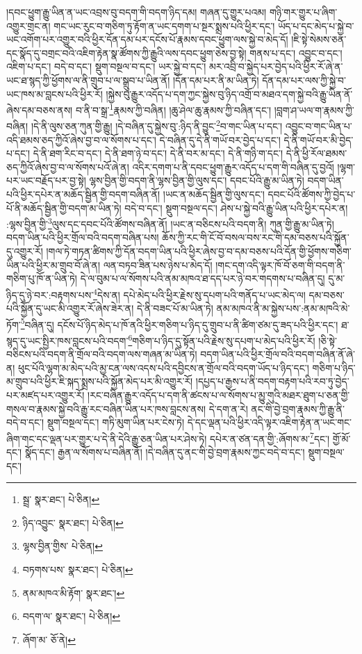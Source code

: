 །དབང་ཕྱུག་རྒྱུ་ཡིན་ན་ཡང་འབྲས་བུ་བདག་གི་བདག་ཉིད་དམ། གཞན་དུ་གྱུར་པའམ། གཉི་གར་གྱུར་པ་ཞིག་འགྱུར་གྲང་ན། གང་ཡང་རུང་བ་གཅིག་ཏུ་རྟོག་ན་ཡང་དགག་པ་སྔར་སྨྲས་པའི་ཕྱིར་དང་། ཡོད་པ་དང་མེད་པ་སྐྱེ་བ་ཡང་འགོག་པར་འགྱུར་བའི་ཕྱིར་དོན་དམ་པར་དངོས་པོ་རྣམས་དབང་ཕྱུག་ལས་སྐྱེ་བ་མེད་དོ། །ཇི་སྟེ་སེམས་ཅན་དང་སྣོད་དུ་བགྲང་བའི་འཇིག་རྟེན་སྣ་ཚོགས་ཀྱི་རྒྱུའི་ལས་དབང་ཕྱུག་ཅེས་བྱ་སྟེ། གནས་པ་དང་། འབྱུང་བ་དང་། འཇིག་པ་དང་། བདེ་བ་དང་། སྡུག་བསྔལ་བ་དང་། ཡར་སྐྱེ་བ་དང་། མར་འབྲི་བ་སྐྱེད་པར་བྱེད་པའི་ཕྱིར་རོ་ཞེ་ན་ཡང་ཐ་སྙད་ཀྱི་ཕྱོགས་ལ་ནི་གྲུབ་པ་ལ་སྒྲུབ་པ་ཡིན་ནོ། །དོན་དམ་པར་ནི་མ་ཡིན་ཏེ། དོན་དམ་པར་ལས་ཀྱི་སྐྱེ་བ་ཡང་ཁས་མ་བླངས་པའི་ཕྱིར་རོ། །སྐྱེས་བུ་རྒྱུར་འདོད་པ་དག་ཀྱང་སྐྱེས་བུ་ཉིད་འགྲོ་བ་མཐའ་དག་སྐྱེ་བའི་རྒྱུ་ཡིན་ནོ་ཞེས་དམ་བཅས་ནས། བ་ནི་བ་སྒྲ་\footnote{སྦྲ་  སྣར་ཐང་།  པེ་ཅིན། }རྣམས་ཀྱི་བཞིན། །ཆུ་ཤེལ་ཆུ་རྣམས་ཀྱི་བཞིན་དང་། །བླག་ཤ་ཡལ་ག་རྣམས་ཀྱི་བཞིན། །དེ་ནི་ལུས་ཅན་ཀུན་གྱི་རྒྱུ། །དེ་བཞིན་དུ་སྐྱེས་བུ་:ཉིད་ནི་བྱུང་\footnote{ཉིད་འབྱུང་  སྣར་ཐང་།  པེ་ཅིན། }བ་གང་ཡིན་པ་དང་། འབྱུང་བ་གང་ཡིན་པ་འདི་ཐམས་ཅད་ཀྱིའོ་ཞེས་བྱ་བ་ལ་སོགས་པ་དང་། དེ་བཞིན་དུ་དེ་ནི་གཡོ་བར་བྱེད་པ་དང་། དེ་ནི་གཡོ་བར་མི་བྱེད་པ་དང་། དེ་ནི་ཐག་རིང་བ་དང་། དེ་ནི་ཐག་ཉེ་བ་དང་། དེ་ནི་བར་མ་དང་། དེ་ནི་གཉི་ག་དང་། དེ་ནི་ཕྱི་རོལ་ཐམས་ཅད་ཀྱིའོ་ཞེས་བྱ་བ་ལ་སོགས་པའོ་ཞེ་ན། འདིར་དགག་པ་ནི་དབང་ཕྱུག་རྒྱུར་འདོད་པ་དག་གི་བཞིན་དུ་བྱའོ། །ལྷག་པར་ཡང་བརྗོད་པར་བྱ་སྟེ། ལྷས་བྱིན་གྱི་བདག་ནི་ལྷས་བྱིན་གྱི་ལུས་དང་། དབང་པོའི་རྒྱུ་མ་ཡིན་ཏེ། བདག་ཡིན་པའི་ཕྱིར་དཔེར་ན་མཆོད་སྦྱིན་གྱི་བདག་བཞིན་ནོ། །ཡང་ན་མཆོད་སྦྱིན་གྱི་ལུས་དང་། དབང་པོའི་ཚོགས་ཀྱི་བྱེད་པ་པོ་ནི་མཆོད་སྦྱིན་གྱི་བདག་མ་ཡིན་ཏེ། བདེ་བ་དང་། སྡུག་བསྔལ་དང་། ཤེས་པ་སྐྱེ་བའི་རྒྱུ་ཡིན་པའི་ཕྱིར་དཔེར་ན། :ལྷས་བྱིན་གྱི་\footnote{ལྷས་བྱིན་གྱིས་  པེ་ཅིན། }ལུས་དང་དབང་པོའི་ཚོགས་བཞིན་ནོ། །ཡང་ན་བཅིངས་པའི་བདག་ནི། ཀུན་གྱི་རྒྱུ་མ་ཡིན་ཏེ། བདག་ཡིན་པའི་ཕྱིར་གྲོལ་བའི་བདག་བཞིན་པས། ཆོས་ཀྱི་རང་གི་ངོ་བོ་བསལ་བས་རང་གི་དམ་བཅས་པའི་སྐྱོན་དུ་འགྱུར་རོ། །གལ་ཏེ་གཏན་ཚིགས་ཀྱི་དོན་བདག་ཡིན་པའི་ཕྱིར་ཞེས་བྱ་བ་དམ་བཅས་པའི་དོན་གྱི་ཕྱོགས་གཅིག་ཡིན་པའི་ཕྱིར་མ་གྲུབ་བོ་ཞེ་ན། ལན་བཏབ་ཟིན་པས་ཉེས་པ་མེད་དོ། །གང་དག་འདི་ལྟར་ཁོ་བོ་ཅག་གི་བདག་ནི་གཅིག་པུ་ཁོ་ན་ཡིན་ཏེ། དེ་ལ་བུམ་པ་ལ་སོགས་པའི་ནམ་མཁའ་ཐ་དད་པར་ཉེ་བར་གདགས་པ་བཞིན་དུ། དུ་མ་ཉིད་དུ་ཉེ་བར་:བརྟགས་པས་\footnote{བཏགས་པས་  སྣར་ཐང་།  པེ་ཅིན། }དེས་ན། དཔེ་མེད་པའི་ཕྱིར་རྗེས་སུ་དཔག་པའི་གནོད་པ་ཡང་མེད་ལ། དམ་བཅས་པའི་སྐྱོན་དུ་ཡང་མི་འགྱུར་རོ་ཞེས་ཟེར་ན། དེ་ནི་བཟང་པོ་མ་ཡིན་ཏེ། ནམ་མཁའ་ནི་མ་སྐྱེས་པས་:ནམ་མཁའི་མེ་ཏོག་\footnote{ནམ་མཁའ་མི་རྟོག་  སྣར་ཐང་། }བཞིན་དུ། དངོས་པོ་ཉིད་མེད་པ་ཁོ་ནའི་ཕྱིར་གཅིག་པ་ཉིད་དུ་གྲུབ་པ་ནི་ཚིག་ཙམ་དུ་ཟད་པའི་ཕྱིར་དང་། ཐ་སྙད་དུ་ཡང་སྤྱིར་ཁས་བླངས་པའི་བདག་\footnote{བདག་ལ་  སྣར་ཐང་།  པེ་ཅིན། }གཅིག་པ་ཉིད་དུ་སྟོན་པའི་རྗེས་སུ་དཔག་པ་མེད་པའི་ཕྱིར་རོ། །ཅི་སྟེ་བཅིངས་པའི་བདག་ནི་གྲོལ་བའི་བདག་ལས་གཞན་མ་ཡིན་ཏེ། བདག་ཡིན་པའི་ཕྱིར་གྲོལ་བའི་བདག་བཞིན་ནོ་ཞེ་ན། ཕུང་པོའི་ལྷག་མ་མེད་པའི་མྱ་ངན་ལས་འདས་པའི་དབྱིངས་ན་གྲོལ་བའི་བདག་ཡོད་པ་ཉིད་དང་། གཅིག་པ་ཉིད་མ་གྲུབ་པའི་ཕྱིར་ཇི་སྐད་སྨྲས་པའི་སྐྱོན་མེད་པར་མི་འགྱུར་རོ། །དཔྱད་པ་རྒྱས་པ་ནི་བདག་བརྟག་པའི་རབ་ཏུ་བྱེད་པར་མཛད་པར་འགྱུར་རོ། །རང་བཞིན་རྒྱུར་འདོད་པ་དག་ནི་ཚངས་པ་ལ་སོགས་པ་མྱུ་གུའི་མཐར་ཐུག་པ་ཅན་གྱི་གསལ་བ་རྣམས་སྐྱེ་བའི་རྒྱུ་རང་བཞིན་ཡིན་པར་ཁས་བླངས་ནས། དེ་དག་ན་རེ། ནང་གི་བྱེ་བྲག་རྣམས་ཀྱི་རྒྱུ་ནི་བདེ་བ་དང་། སྡུག་བསྔལ་དང་། གཏི་མུག་ཡིན་པར་ངེས་ཏེ། དེ་དང་ལྡན་པའི་ཕྱིར་འདི་ལྟར་འཇིག་རྟེན་ན་ཡང་གང་ཞིག་གང་དང་ལྡན་པར་གྱུར་པ་དེ་ནི་དེའི་རྒྱུ་ཅན་ཡིན་པར་ཤེས་ཏེ། དཔེར་ན་ཙན་དན་གྱི་:ཞོགས་མ་\footnote{ཞོག་མ་  ཅོ་ནེ། }དང་། གྱོ་མོ་དང་། སྣོད་དང་། རྒྱན་ལ་སོགས་པ་བཞིན་ནོ། །དེ་བཞིན་དུ་ནང་གི་བྱེ་བྲག་རྣམས་ཀྱང་བདེ་བ་དང་། སྡུག་བསྔལ་དང་། 